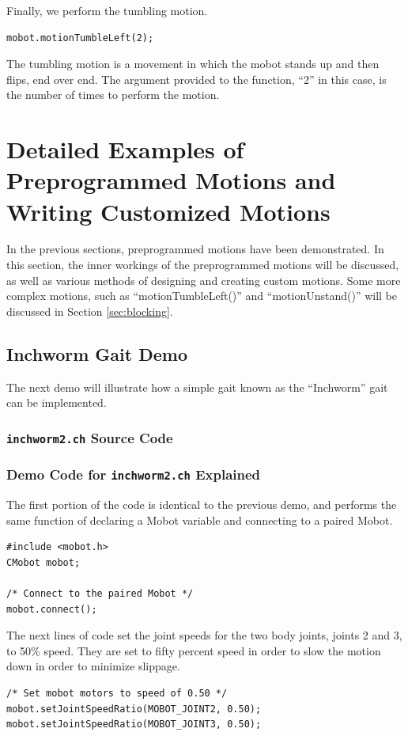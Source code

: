 \documentclass{article}
\begin{document}
Finally, we perform the tumbling motion. 
\begin{verbatim}
mobot.motionTumbleLeft(2);
\end{verbatim}
The tumbling motion is a movement in which
the mobot stands up and then flips, end over end. The argument provided to the
function, ``2'' in this case, is the number of times to perform the motion.

\section{Detailed Examples of Preprogrammed Motions and Writing Customized Motions}
In the previous sections, preprogrammed motions have been demonstrated. In this section,
the inner workings of the preprogrammed motions will be discussed, as well as various
methods of designing and creating custom motions. Some more complex motions, such as 
``motionTumbleLeft()'' and ``motionUnstand()'' will be discussed in Section \ref{sec:blocking}.
\subsection{Inchworm Gait Demo}
The next demo will illustrate how a simple gait known as the ``Inchworm'' gait 
can be implemented.

\subsubsection{\texttt{inchworm2.ch} Source Code}


\subsubsection{Demo Code for \texttt{inchworm2.ch} Explained}
The first portion of the code is identical to the previous demo, and performs
the same function of declaring a Mobot variable and connecting to a 
paired Mobot.
\begin{verbatim}
#include <mobot.h>
CMobot mobot;

/* Connect to the paired Mobot */
mobot.connect();
\end{verbatim}

The next lines of code set the joint speeds for the two body joints, joints 
2 and 3, to 50\% speed. They are set to fifty percent speed in order to 
slow the motion down in order to minimize slippage.

\begin{verbatim}
/* Set mobot motors to speed of 0.50 */
mobot.setJointSpeedRatio(MOBOT_JOINT2, 0.50);
mobot.setJointSpeedRatio(MOBOT_JOINT3, 0.50);
\end{verbatim}
\end{document}
